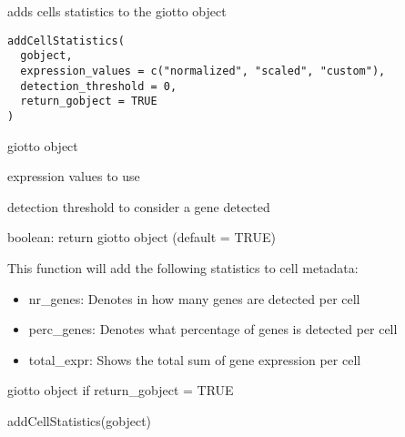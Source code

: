 \documentclass[a4paper]{book}
\begin{document}
%
\begin{Description}\relax
adds cells statistics to the giotto object
\end{Description}
%
\begin{Usage}
\begin{verbatim}
addCellStatistics(
  gobject,
  expression_values = c("normalized", "scaled", "custom"),
  detection_threshold = 0,
  return_gobject = TRUE
)
\end{verbatim}
\end{Usage}
%
\begin{Arguments}
\begin{ldescription}
\item[\code{gobject}] giotto object

\item[\code{expression\_values}] expression values to use

\item[\code{detection\_threshold}] detection threshold to consider a gene detected

\item[\code{return\_gobject}] boolean: return giotto object (default = TRUE)
\end{ldescription}
\end{Arguments}
%
\begin{Details}\relax
This function will add the following statistics to cell metadata:
\begin{itemize}

\item{} nr\_genes: Denotes in how many genes are detected per cell
\item{} perc\_genes: Denotes what percentage of genes is detected per cell
\item{} total\_expr: Shows the total sum of gene expression per cell

\end{itemize}

\end{Details}
%
\begin{Value}
giotto object if return\_gobject = TRUE
\end{Value}
%
\begin{Examples}
\begin{ExampleCode}
    addCellStatistics(gobject)
\end{ExampleCode}
\end{Examples}
\end{document}
